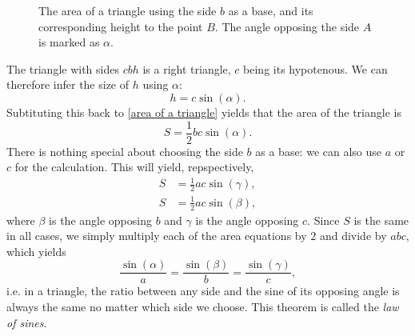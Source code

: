 \begin{figure}
	\centering
	\caption{The area of a triangle using the side $b$ as a base, and its corresponding height to the point $B$. The angle opposing the side $A$ is marked as $\alpha$.}
	\label{fig:area of a triangle}
\end{figure}

The triangle with sides $cbh$ is a right triangle, $c$ being its hypotenous. We can therefore infer the size of $h$ using $\alpha$:
\begin{equation}
	h = c\sin(\alpha).
	\label{eq:first equation in law of sines}
\end{equation}
Subtituting this back to \eqref{area of a triangle} yields that the area of the triangle is
\begin{equation}
	S = \frac{1}{2}bc\sin(\alpha).
	\label{eq:area using sin theta}
\end{equation}
There is nothing special about choosing the side $b$ as a base: we can also use $a$ or $c$ for the calculation. This will yield, repspectively,
\begin{align}
	S &= \frac{1}{2}ac\sin(\gamma),\\
	S &= \frac{1}{2}ac\sin(\beta),
	\label{eq:}
\end{align}
where $\beta$ is the angle opposing $b$ and $\gamma$ is the angle opposing $c$. Since $S$ is the same in all cases, we simply multiply each of the area equations by $2$ and divide by $abc$, which yields
\begin{equation}
	\frac{\sin(\alpha)}{a} = \frac{\sin(\beta)}{b} = \frac{\sin(\gamma)}{c},
	\label{eq:law of sines}
\end{equation}
i.e. in a triangle, the ratio between any side and the sine of its opposing angle is always the same no matter which side we choose. This theorem is called the \emph{law of sines}.

